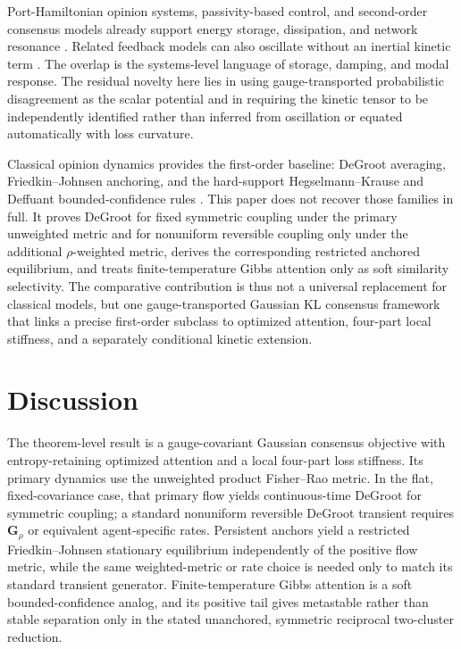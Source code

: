 \documentclass[12pt]{article}
\begin{document}
Port-Hamiltonian opinion systems, passivity-based control, and second-order consensus models already support energy storage, dissipation, and network resonance \citep{XueHircheCao2020,BaumannSokolovTyloo2020}. Related feedback models can also oscillate without an inertial kinetic term \citep{SampsonPorterRestrepo2025}. The overlap is the systems-level language of storage, damping, and modal response. The residual novelty here lies in using gauge-transported probabilistic disagreement as the scalar potential and in requiring the kinetic tensor to be independently identified rather than inferred from oscillation or equated automatically with loss curvature.

Classical opinion dynamics provides the first-order baseline: DeGroot averaging, Friedkin--Johnsen anchoring, and the hard-support Hegselmann--Krause and Deffuant bounded-confidence rules \citep{degroot1974,friedkin1990,hegselmann2002opinion,deffuant2000}. This paper does not recover those families in full. It proves DeGroot for fixed symmetric coupling under the primary unweighted metric and for nonuniform reversible coupling only under the additional $\rho$-weighted metric, derives the corresponding restricted anchored equilibrium, and treats finite-temperature Gibbs attention only as soft similarity selectivity. The comparative contribution is thus not a universal replacement for classical models, but one gauge-transported Gaussian KL consensus framework that links a precise first-order subclass to optimized attention, four-part local stiffness, and a separately conditional kinetic extension.

\section{Discussion}

The theorem-level result is a gauge-covariant Gaussian consensus objective with entropy-retaining optimized attention and a local four-part loss stiffness. Its primary dynamics use the unweighted product Fisher--Rao metric. In the flat, fixed-covariance case, that primary flow yields continuous-time DeGroot for symmetric coupling; a standard nonuniform reversible DeGroot transient requires $\mathbf G_\rho$ or equivalent agent-specific rates. Persistent anchors yield a restricted Friedkin--Johnsen stationary equilibrium independently of the positive flow metric, while the same weighted-metric or rate choice is needed only to match its standard transient generator. Finite-temperature Gibbs attention is a soft bounded-confidence analog, and its positive tail gives metastable rather than stable separation only in the stated unanchored, symmetric reciprocal two-cluster reduction.
\end{document}
